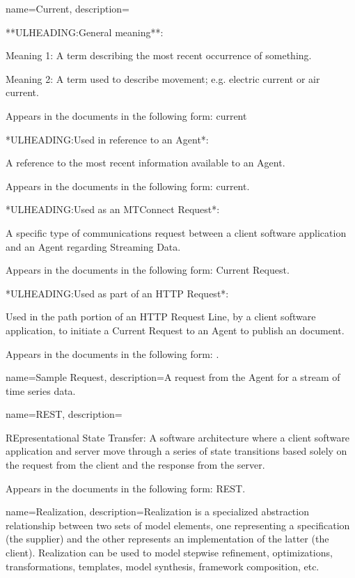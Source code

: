 {
    name={Current},
	description={
	**ULHEADING:General meaning**:

	Meaning 1:  A term describing the most recent occurrence of something.

	Meaning 2:  A term used to describe movement; e.g. electric current or air current.

	Appears in the documents in the following form: current

	*ULHEADING:Used in reference to an \gls{Agent}*:

	A reference to the most recent information available to an \gls{Agent}.

	Appears in the documents in the following form: current.

	*ULHEADING:Used as an \gls{MTConnect Request}*:

	A specific type of communications request between a client software application and an \gls{Agent} regarding \gls{Streaming Data}.  

	Appears in the documents in the following form: \gls{Current Request}.

	*ULHEADING:Used as part of an \gls{HTTP Request}*:

	Used in the path portion of an \gls{HTTP Request Line}, by a client software application, to initiate a \gls{Current Request} to an \gls{Agent} to publish an  document.

	Appears in the documents in the following form: .
}
}

{
    name={Sample Request},
	description={A request from the \gls{Agent} for a stream of time series data.}
}

{
    name={REST},
	description={
	REpresentational State Transfer:  A software architecture where a client software application and server move through a series of state transitions based solely on the request from the client and the response from the server. 

	Appears in the documents in the following form: REST.
}
}

{
    name={Realization},
	description={Realization is a specialized abstraction relationship between two sets of model elements, one representing a specification (the supplier) and the other represents an implementation of the latter (the client). Realization can be used to model stepwise refinement, optimizations, transformations, templates, model synthesis, framework composition, etc.}
}

